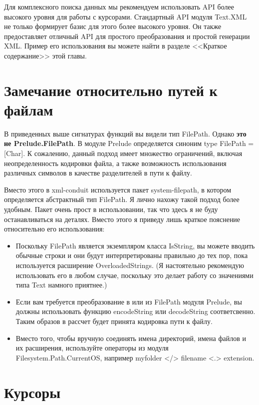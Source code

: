 Для комплексного поиска данных мы рекомендуем использовать API более высокого уровня для работы с курсорами. Стандартный API модуля Text.XML не только формирует базис для этого более высокого уровня. Он также предоставляет отличный API для простого преобразования и простой генерации XML. Пример его использования вы можете найти в разделе <<Краткое содержание>> этой главы.

\section{Замечание относительно путей к файлам} %

В приведенных выше сигнатурах функций вы видели тип FilePath. Однако {\bf это не Prelude.FilePath}. В модуле Prelude определяется синоним type FilePath = [Char]. К сожалению, данный подход имеет множество ограничений, включая неопределенность кодировки файла, а также возможность использования различных символов в качестве разделителей в пути к файлу.

Вместо этого в xml-conduit используется пакет system-filepath, в котором определяется абстрактный тип FilePath. Я лично нахожу такой подход более удобным. Пакет очень прост в использовании, так что здесь я не буду останавливаться на деталях. Вместо этого я приведу лишь краткое пояснение относительно его использования:

\begin{itemize}
\item Поскольку FilePath является экземпляром класса IsString, вы можете вводить обычные строки и они будут интерпретированы правильно до тех пор, пока используется расширение OverloadedStrings. (Я настоятельно рекомендую использовать его в любом случае, поскольку это делает работу со значениями типа Text намного приятнее.)
\item Если вам требуется преобразование в или из FilePath модуля Prelude, вы должны использовать функцию encodeString или decodeString соответсвенно. Таким образов в рассчет будет принята кодировка пути к файлу.
\item Вместо того, чтобы вручную соединять имена директорий, имена файлов и их расширения, используйте операторы из модуля Filesystem.Path.CurrentOS, например myfolder </> filename <.> extension.
\end{itemize}
  
\section{Курсоры} %

